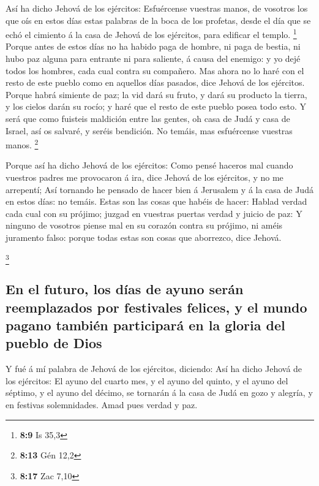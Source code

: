  Así ha dicho Jehová de los ejércitos: Esfuércense
vuestras manos, de vosotros los que oís en estos días estas palabras de
la boca de los profetas, desde el día que se echó el cimiento á la casa
de Jehová de los ejércitos, para edificar el templo. \footnote{\textbf{8:9}
  Is 35,3}  Porque antes de estos días no ha habido paga
de hombre, ni paga de bestia, ni hubo paz alguna para entrante ni para
saliente, á causa del enemigo: y yo dejé todos los hombres, cada cual
contra su compañero.  Mas ahora no lo haré con el resto
de este pueblo como en aquellos días pasados, dice Jehová de los
ejércitos.  Porque habrá simiente de paz; la vid dará su
fruto, y dará su producto la tierra, y los cielos darán su rocío; y haré
que el resto de este pueblo posea todo esto.  Y será que
como fuisteis maldición entre las gentes, oh casa de Judá y casa de
Israel, así os salvaré, y seréis bendición. No temáis, mas esfuércense
vuestras manos. \footnote{\textbf{8:13} Gén 12,2}

 Porque así ha dicho Jehová de los ejércitos: Como pensé
haceros mal cuando vuestros padres me provocaron á ira, dice Jehová de
los ejércitos, y no me arrepentí;  Así tornando he
pensado de hacer bien á Jerusalem y á la casa de Judá en estos días: no
temáis.  Estas son las cosas que habéis de hacer: Hablad
verdad cada cual con su prójimo; juzgad en vuestras puertas verdad y
juicio de paz:  Y ninguno de vosotros piense mal en su
corazón contra su prójimo, ni améis juramento falso: porque todas estas
son cosas que aborrezco, dice Jehová.

\footnote{\textbf{8:17} Zac 7,10}

\hypertarget{en-el-futuro-los-duxedas-de-ayuno-seruxe1n-reemplazados-por-festivales-felices-y-el-mundo-pagano-tambiuxe9n-participaruxe1-en-la-gloria-del-pueblo-de-dios}{%
\subsection{En el futuro, los días de ayuno serán reemplazados por
festivales felices, y el mundo pagano también participará en la gloria
del pueblo de
Dios}\label{en-el-futuro-los-duxedas-de-ayuno-seruxe1n-reemplazados-por-festivales-felices-y-el-mundo-pagano-tambiuxe9n-participaruxe1-en-la-gloria-del-pueblo-de-dios}}

 Y fué á mí palabra de Jehová de los ejércitos, diciendo:
 Así ha dicho Jehová de los ejércitos: El ayuno del
cuarto mes, y el ayuno del quinto, y el ayuno del séptimo, y el ayuno
del décimo, se tornarán á la casa de Judá en gozo y alegría, y en
festivas solemnidades. Amad pues verdad y paz.

